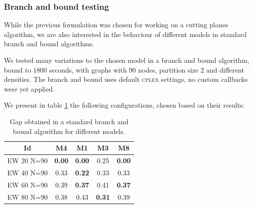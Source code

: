 \subsubsection{Branch and bound testing}

While the previous formulation was chosen for working on a cutting planes algorithm, we are also interested in the behaviour of different models in standard branch and bound algorithms. 

We tested many variations to the chosen model in a branch and bound algorithm, bound to $1800$ seconds, with graphs with $90$ nodes, partition size $2$ and different densities. The branch and bound uses default \textsc{cplex} settings, no custom callbacks were yet applied.

We present in table \ref{table:models:bnb} the following configurations, chosen based on their results:

\begin{itemize}
\end{itemize}

\begin{table}
\label{table:models:bnb}
\centering

\begin{tabular}{|c|c|c|c|c|}
\hline
\multicolumn{1}{|c|}{Id} & \multicolumn{1}{|c|}{M4} & \multicolumn{1}{|c|}{M1} & \multicolumn{1}{|c|}{M3}  & \multicolumn{1}{|c|}{M8} 
\\
\hline
EW 20 N=90 & \textbf{0.00} & \textbf{0.00} & 0.25  & \textbf{0.00}  
\\
EW 40 N=90 & 0.33 & \textbf{0.22} & 0.33 & 0.33 
\\
EW 60 N=90 & 0.39 & \textbf{0.37} & 0.41 & \textbf{0.37}
\\
EW 80 N=90 & 0.38 & 0.43 & \textbf{0.31} & 0.39
\\
\hline 
 \end{tabular}

\caption{Gap obtained in a standard branch and bound algorithm for different models.}

\end{table}

